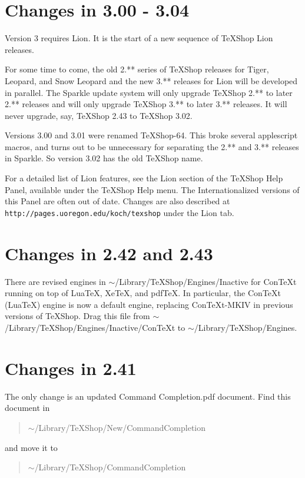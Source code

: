 \documentclass[11pt, oneside]{amsart}
\begin{document}
\section{Changes in 3.00 - 3.04}

Version 3 requires Lion. It is the start of a new sequence of TeXShop Lion releases. 

For some time to come, the old 2.** series of TeXShop releases for Tiger, Leopard, and Snow Leopard and the new 3.** releases for Lion
will be developed in parallel. The Sparkle update
system will only upgrade TeXShop 2.** to later 2.** releases and will only upgrade TeXShop 3.** to later 3.** releases. It will never upgrade, say, TeXShop 2.43 to
TeXShop 3.02.

Versions 3.00 and 3.01 were renamed TeXShop-64. This broke several applescript macros, and turns out to be unnecessary for separating the 2.** and 3.** releases in Sparkle. So version 3.02 has the old TeXShop name. 

For a detailed list of Lion features, see the Lion section of the TeXShop Help Panel, available under the TeXShop Help menu. The Internationalized versions of
this Panel are often out of date. Changes are also described at \nolinkurl{http://pages.uoregon.edu/koch/texshop} under the Lion tab.

\section{Changes in 2.42 and 2.43}
There are revised engines in $\sim$/Library/TeXShop/Engines/Inactive for ConTeXt running on top of LuaTeX, XeTeX, and pdfTeX.
In particular, the ConTeXt (LuaTeX) engine is now a default engine, replacing ConTeXt-MKIV in previous versions of TeXShop. Drag this file
from $\sim$/Library/TeXShop/Engines/Inactive/ConTeXt to $\sim$/Library/TeXShop/Engines.



\section{Changes in 2.41}

The only change is an updated Command Completion.pdf document. Find this document in
\begin{quotation}
 $\sim$/Library/TeXShop/New/CommandCompletion
 \end{quotation}  and move it to  \begin{quotation}$\sim$/Library/TeXShop/CommandCompletion\end{quotation}
\end{document}
